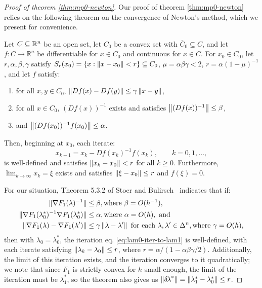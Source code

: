 \documentclass[smallcondensed]{svjour3}
\begin{document}
\begin{proof}[Proof of theorem \ref{thm:mp0-newton}]
  Our proof of theorem \ref{thm:mp0-newton} relies on the following
  theorem on the convergence of Newton's method, which we present for
  convenience.

  \begin{theorem}\label{thm:stoer-bulirsch}
    Let $C \subseteq \mathbb{R}^n$ be an open set, let $C_0$ be a convex set
    with $\overline{C}_0 \subseteq C$, and let
    $f : C \to \mathbb{R}^n$ be differentiable for $x \in C_0$ and
    continuous for $x \in C$. For $x_0 \in C_0$, let
    $r, \alpha, \beta, \gamma$ satisfy
    $S_r(x_0) = \left\{x : \left\|x - x_0\right\| < r\right\} \subseteq C_0$,
    $\mu = \alpha\beta\gamma < 2$, $r = \alpha(1 - \mu)^{-1}$, and let
    $f$ satisfy:
    \begin{enumerate}[label=(\alph*)]
    \item for all $x, y \in C_0$,
      $\left\|D f(x) - D f(y)\right\| \leq \gamma \left\|x - y\right\|$,
    \item for all $x \in C_0$, $(D f(x))^{-1}$ exists and satisfies
      $\left\|(Df(x))^{-1}\right\| \leq \beta$,
    \item and $\left\|(Df(x_0))^{-1} f(x_0)\right\| \leq \alpha$.
    \end{enumerate}
    Then, beginning at $x_0$, each iterate:
    \begin{equation}
      x_{k+1} = x_k - Df(x_k)^{-1} f(x_k), \qquad k = 0, 1, \hdots,
    \end{equation}
    is well-defined and satisfies $\left\|x_k - x_0\right\| < r$ for all
    $k \geq 0$. Furthermore, $\lim_{k \to \infty} x_k = \xi$ exists and
    satisfies $\left\|\xi - x_0\right\| \leq r$ and $f(\xi) = 0$.
  \end{theorem}

  For our situation, Theorem 5.3.2 of Stoer and
  Bulirsch~\cite{stoer2013introduction} indicates that if:
  \begin{align}
    \|\nabla F_1(\lambda)^{-1}\| &\leq \beta, \mbox{where } \beta = O(h^{-1}) \label{enum:sb-newton-1}, \\
    \|\nabla F_1(\lambda_0^*)^{-1} \nabla F_1(\lambda_0^*)\| &\leq \alpha, \mbox{where } \alpha = O(h), \label{enum:sb-newton-2} \mbox{ and} \\
    \|\nabla F_1(\lambda) - \nabla F_1(\lambda')\| &\leq \gamma \left\|\lambda - \lambda'\right\| \mbox{ for each } \lambda, \lambda' \in \Delta^n, \mbox{where } \gamma = O(h), \label{enum:sb-newton-3}
  \end{align}
  then with $\lambda_0 = \lambda_0^*$, the iteration eq.\@
  \ref{eq:lam0-iter-to-lam1} is well-defined, with each iterate
  satisfying $\left\|\lambda_k - \lambda_0\right\| \leq r$, where
  $r = \alpha/(1 - \alpha\beta\gamma/2)$. Additionally, the limit of
  this iteration exists, and the iteration converges to it
  quadratically; we note that since $F_1$ is strictly convex for $h$
  small enough, the limit of the iteration must be $\lambda_1^*$, so
  the theorem also gives us
  $\left\|{\delta \hspace{-0.1em} \lambda}^*\right\| = \left\|\lambda_1^* - \lambda_0^*\right\| \leq r$.


\end{proof}
\end{document}
